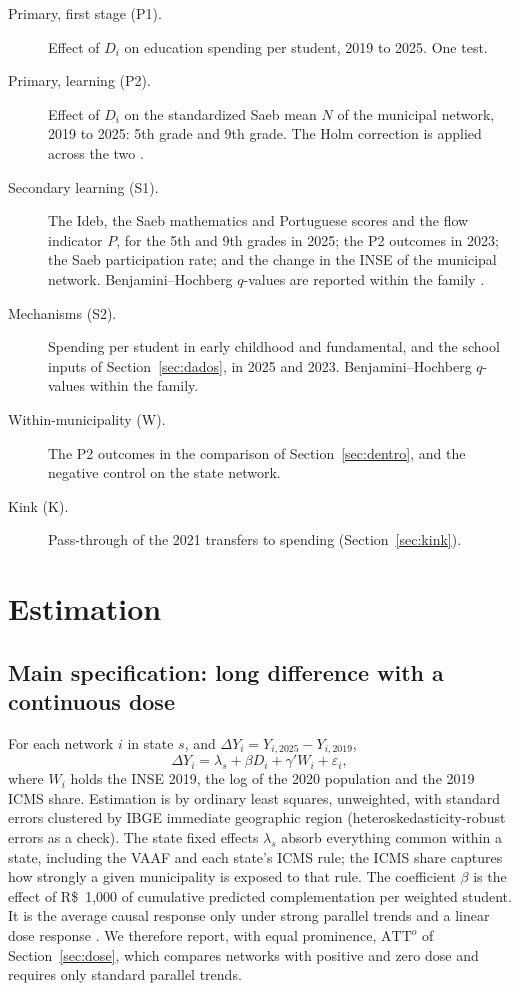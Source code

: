 \documentclass[11pt]{article}
\newcommand{\reais}{R\$}
\begin{document}
\begin{description}
\item[Primary, first stage (P1).] Effect of $D_i$ on education spending per student, 2019 to 2025. One test.
\item[Primary, learning (P2).] Effect of $D_i$ on the standardized Saeb mean $N$ of the municipal network, 2019 to 2025: 5th grade and 9th grade. The Holm correction is applied across the two \citep{holm1979}.
\item[Secondary learning (S1).] The Ideb, the Saeb mathematics and Portuguese scores and the flow indicator $P$, for the 5th and 9th grades in 2025; the P2 outcomes in 2023; the Saeb participation rate; and the change in the INSE of the municipal network. Benjamini--Hochberg $q$-values are reported within the family \citep{benjamini1995}.
\item[Mechanisms (S2).] Spending per student in early childhood and fundamental, and the school inputs of Section~\ref{sec:dados}, in 2025 and 2023. Benjamini--Hochberg $q$-values within the family.
\item[Within-municipality (W).] The P2 outcomes in the comparison of Section~\ref{sec:dentro}, and the negative control on the state network.
\item[Kink (K).] Pass-through of the 2021 transfers to spending (Section~\ref{sec:kink}).
\end{description}

\section{Estimation}\label{sec:estimacao}

\subsection{Main specification: long difference with a continuous dose}
For each network $i$ in state $s$, and $\Delta Y_i = Y_{i,2025} - Y_{i,2019}$,
\begin{equation}\label{eq:principal}
\Delta Y_i = \lambda_s + \beta D_i + \gamma' W_i + \varepsilon_i ,
\end{equation}
where $W_i$ holds the INSE 2019, the log of the 2020 population and the 2019 ICMS share. Estimation is by ordinary least squares, unweighted, with standard errors clustered by IBGE immediate geographic region (heteroskedasticity-robust errors as a check). The state fixed effects $\lambda_s$ absorb everything common within a state, including the VAAF and each state's ICMS rule; the ICMS share captures how strongly a given municipality is exposed to that rule. The coefficient $\beta$ is the effect of \reais{}~1,000 of cumulative predicted complementation per weighted student. It is the average causal response only under strong parallel trends and a linear dose response \citep{callaway2024}. We therefore report, with equal prominence, $\text{ATT}^o$ of Section~\ref{sec:dose}, which compares networks with positive and zero dose and requires only standard parallel trends.
\end{document}
